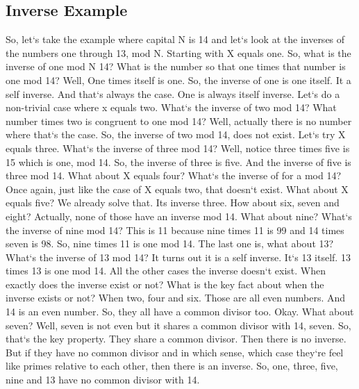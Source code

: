 \subsection{Inverse  Example}
So, let`s take the example where capital N is 14 and let`s look at the inverses of the numbers one through 13, mod N\@.
Starting with X equals one.
So, what is the inverse of one mod N 14? What is the number so that one times that number is one mod 14? Well, One times itself is one.
So, the inverse of one is one itself.
It a self inverse.
And that`s always the case.
One is always itself inverse.
Let`s do a non-trivial case where x equals two.
What`s the inverse of two mod 14? What number times two is congruent to one mod 14? Well, actually there is no number where that`s the case.
So, the inverse of two mod 14, does not exist.
Let`s try X equals three.
What`s the inverse of three mod 14? Well, notice three times five is 15 which is one, mod 14.
So, the inverse of three is five.
And the inverse of five is three mod 14.
What about X equals four? What`s the inverse of for a mod 14? Once again, just like the case of X equals two, that doesn`t exist.
What about X equals five? We already solve that.
Its inverse three.
How about six, seven and eight? Actually, none of those have an inverse mod 14.
What about nine? What`s the inverse of nine mod 14? This is 11 because nine times 11 is 99 and 14 times seven is 98.
So, nine times 11 is one mod 14.
The last one is, what about 13? What`s the inverse of 13 mod 14? It turns out it is a self inverse.
It`s 13 itself. 13 times 13 is one mod 14.
All the other cases the inverse doesn`t exist.
When exactly does the inverse exist or not? What is the key fact about when the inverse exists or not? When two, four and six.
Those are all even numbers.
And 14 is an even number.
So, they all have a common divisor too.
Okay.
What about seven? Well, seven is not even but it shares a common divisor with 14, seven.
So, that`s the key property.
They share a common divisor.
Then there is no inverse.
But if they have no common divisor and in which sense, which case they`re feel like primes relative to each other, then there is an inverse.
So, one, three, five, nine and 13 have no common divisor with 14.

